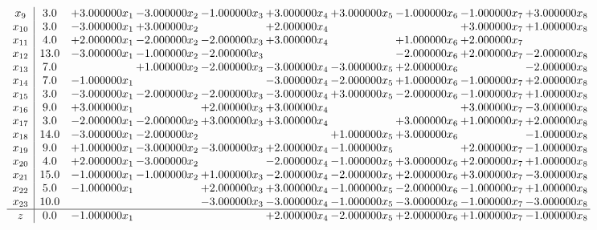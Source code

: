 \documentclass[10pt]{article}
\begin{document}
\[\begin{array}{c| c c@{\hskip 2pt} c@{\hskip 2pt} c@{\hskip 2pt} c@{\hskip 2pt} c@{\hskip 2pt} c@{\hskip 2pt} c@{\hskip 2pt} c@{\hskip 2pt} }
 x_{9}   &  3.0 & + 3.000000 x_{1} & -3.000000 x_{2} & -1.000000 x_{3} & + 3.000000 x_{4} & + 3.000000 x_{5} & -1.000000 x_{6} & -1.000000 x_{7} & + 3.000000 x_{8}\\
 x_{10}   &  3.0 & -3.000000 x_{1} & + 3.000000 x_{2} &   & + 2.000000 x_{4} &    &   & + 3.000000 x_{7} & + 1.000000 x_{8}\\
 x_{11}   &  4.0 & + 2.000000 x_{1} & -2.000000 x_{2} & -2.000000 x_{3} & + 3.000000 x_{4} &   & + 1.000000 x_{6} & + 2.000000 x_{7} &   \\
 x_{12}   &  13.0 & -3.000000 x_{1} & -1.000000 x_{2} & -2.000000 x_{3} &    &   & -2.000000 x_{6} & + 2.000000 x_{7} & -2.000000 x_{8}\\
 x_{13}   &  7.0  &   & + 1.000000 x_{2} & -2.000000 x_{3} & -3.000000 x_{4} & -3.000000 x_{5} & + 2.000000 x_{6} &   & -2.000000 x_{8}\\
 x_{14}   &  7.0 & -1.000000 x_{1} &    &   & -3.000000 x_{4} & -2.000000 x_{5} & + 1.000000 x_{6} & -1.000000 x_{7} & + 2.000000 x_{8}\\
 x_{15}   &  3.0 & -3.000000 x_{1} & -2.000000 x_{2} & -2.000000 x_{3} & -3.000000 x_{4} & + 3.000000 x_{5} & -2.000000 x_{6} & -1.000000 x_{7} & + 1.000000 x_{8}\\
 x_{16}   &  9.0 & + 3.000000 x_{1} &   & + 2.000000 x_{3} & + 3.000000 x_{4} &    &   & + 3.000000 x_{7} & -3.000000 x_{8}\\
 x_{17}   &  3.0 & -2.000000 x_{1} & -2.000000 x_{2} & + 3.000000 x_{3} & + 3.000000 x_{4} &   & + 3.000000 x_{6} & + 1.000000 x_{7} & + 2.000000 x_{8}\\
 x_{18}   &  14.0 & -3.000000 x_{1} & -2.000000 x_{2} &    &   & + 1.000000 x_{5} & + 3.000000 x_{6} &   & -1.000000 x_{8}\\
 x_{19}   &  9.0 & + 1.000000 x_{1} & -3.000000 x_{2} & -3.000000 x_{3} & + 2.000000 x_{4} & -1.000000 x_{5} &   & + 2.000000 x_{7} & -1.000000 x_{8}\\
 x_{20}   &  4.0 & + 2.000000 x_{1} & -3.000000 x_{2} &   & -2.000000 x_{4} & -1.000000 x_{5} & + 3.000000 x_{6} & + 2.000000 x_{7} & + 1.000000 x_{8}\\
 x_{21}   &  15.0 & -1.000000 x_{1} & -1.000000 x_{2} & + 1.000000 x_{3} & -2.000000 x_{4} & -2.000000 x_{5} & + 2.000000 x_{6} & + 3.000000 x_{7} & -3.000000 x_{8}\\
 x_{22}   &  5.0 & -1.000000 x_{1} &   & + 2.000000 x_{3} & + 3.000000 x_{4} & -1.000000 x_{5} & -2.000000 x_{6} & -1.000000 x_{7} & + 1.000000 x_{8}\\
 x_{23}   &  10.0  &    &   & -3.000000 x_{3} & -3.000000 x_{4} & -1.000000 x_{5} & -3.000000 x_{6} & -1.000000 x_{7} & -3.000000 x_{8}\\
\hline
z    &  0.0 & -1.000000 x_{1} &    &   & + 2.000000 x_{4} & -2.000000 x_{5} & + 2.000000 x_{6} & + 1.000000 x_{7} & -1.000000 x_{8}\\
\end{array}\]
\end{document}
